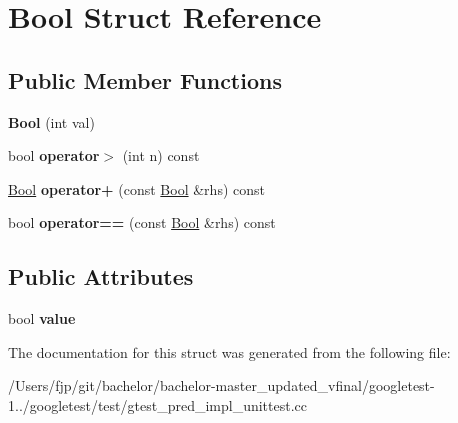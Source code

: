\hypertarget{struct_bool}{}\section{Bool Struct Reference}
\label{struct_bool}
\subsection*{Public Member Functions}
\begin{DoxyCompactItemize}
\item 
\mbox{\label{struct_bool_a03dfd4851b13abb29414887fcada7fca}} 
{\bfseries Bool} (int val)
\item 
\mbox{\label{struct_bool_a7baecbc58992eb06157fbbbaa560be0b}} 
bool {\bfseries operator$>$} (int n) const
\item 
\mbox{\label{struct_bool_a6f4ecdec19082e896cffce66e6b6e7cc}} 
\mbox{\hyperlink{struct_bool}{Bool}} {\bfseries operator+} (const \mbox{\hyperlink{struct_bool}{Bool}} \&rhs) const
\item 
\mbox{\label{struct_bool_afe799a4977c5ebe4c215d5d4ebd77adb}} 
bool {\bfseries operator==} (const \mbox{\hyperlink{struct_bool}{Bool}} \&rhs) const
\end{DoxyCompactItemize}
\subsection*{Public Attributes}
\begin{DoxyCompactItemize}
\item 
\mbox{\label{struct_bool_a16be863c269f988cdcbe59f9d846a141}} 
bool {\bfseries value}
\end{DoxyCompactItemize}


The documentation for this struct was generated from the following file\+:\begin{DoxyCompactItemize}
\item 
/\+Users/fjp/git/bachelor/bachelor-\/master\+\_\+updated\+\_\+vfinal/googletest-\/1../googletest/test/gtest\+\_\+pred\+\_\+impl\+\_\+unittest.\+cc\end{DoxyCompactItemize}

